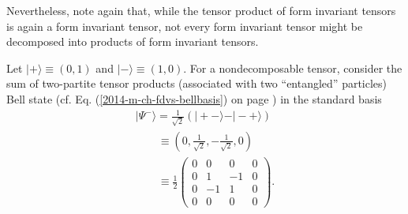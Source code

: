 Nevertheless, note again that, while the tensor product of form invariant tensors is again a form invariant tensor,  not every form
invariant tensor might be decomposed into products of form invariant tensors.

{
\color{blue}
\bexample
Let
$\vert + \rangle  \equiv   (0,1)$
and
$\vert - \rangle  \equiv   (1,0)$.
For a nondecomposable tensor, consider the sum of two-partite tensor products (associated with two ``entangled'' particles)
Bell state (cf. Eq. (\ref{2014-m-ch-fdvs-bellbasis}) on page \pageref{2014-m-ch-fdvs-bellbasis}) in the standard basis     
\begin{equation}
\begin{split}
\vert \Psi^-\rangle = \frac{1}{\sqrt{2}}\left(\vert +-\rangle   - \vert -+\rangle  \right)   \\
\qquad \equiv  \left( 0,\frac{1}{\sqrt{2}},- \frac{1}{\sqrt{2}} ,  0 \right)     \\
\qquad \equiv  \frac{1}{2}
\begin{pmatrix}
0&0&0&0\\
0&1&-1&0\\
0&-1&1&0\\
0&0&0&0
\end{pmatrix}
.
\end{split}
\label{2011-m-bellstatenondec}
\end{equation}

}
